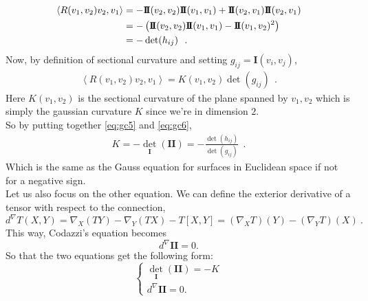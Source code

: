 \documentclass[a4paper,11pt,openright,twoside]{book}
\newcommand{\I}{\mathbf{I}}
\newcommand{\II}{\mathbf{I\!I}}
\newcommand{\1}{\mathds{1}}
\theoremstyle{plain}
\theoremstyle{definition}
\theoremstyle{remark}
\begin{document}
\begin{align}\label{eq:gc5}
	\left<R(v_1,v_2)v_2,v_1 \right>	&= -\II(v_2,v_2)\II(v_1,v_1) +\II(v_2,v_1)\II(v_2,v_1)\notag\\
									&= - \left( \II(v_2,v_2)\II(v_1,v_1)-\II(v_1,v_2)^2 \right)\notag\\
									&= -\det(h_{ij}) 
\ \ .
\end{align}
Now, by definition of sectional curvature and setting $g_{ij} =\I( v_i,v_j) $, 
\begin{align}\label{eq:gc6}
	\left<R(v_1,v_2)v_2,v_1 \right> = K(v_1,v_2)\det(g_{ij}) 
\ \ . 
\end{align}
Here $K(v_1,v_2)$ is the sectional curvature of the plane spanned by $v_1,v_2$ which is simply the gaussian curvature $K$ since we're in dimension $2$.\\
So by putting together \eqref{eq:gc5} and  \eqref{eq:gc6},
\begin{align*}
	K = -\det_\I (\II) = - \frac{\det(h_{ij})}{\det(g_{ij})}
\ \ . 
\end{align*}
Which is the same as the Gauss equation for surfaces in Euclidean space if not for a negative sign.\\
Let us also focus on the other equation. We can define the exterior derivative of a tensor with respect to the connection, \[ d^\nabla T(X,Y) = \nabla_X(TY)-\nabla_Y(TX) -T[X,Y]  = (\nabla_X T)(Y) - (\nabla_Y T)(X)\ .\] This way, Codazzi's equation becomes
\[d^\nabla \II = 0.\] 
So that the two equations get the following form:
\begin{equation}
\begin{cases}\label{eq:gc}
	\displaystyle \det_\I (\II)= -K  \\
	\displaystyle d^\nabla \II = 0. 
\end{cases}	
\end{equation}
\end{document}
